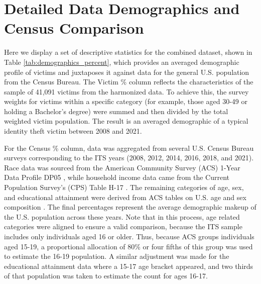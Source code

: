 \clearpage
\appendix



\section{Detailed Data Demographics and Census Comparison}
\label{app:demographics_census}

Here we display a set of descriptive statistics for the combined dataset,  shown in Table \ref{tab:demographics_percent}, which provides an averaged demographic profile of victims and juxtaposes it against data for the general U.S. population from the Census Bureau. The Victim \% column reflects the characteristics of the sample of 41,091 victims from the harmonized data. To achieve this, the survey weights for victims within a specific category (for example, those aged 30-49 or holding a Bachelor's degree) were summed and then divided by the total weighted victim population. The result is an averaged demographic of a typical identity theft victim between 2008 and 2021. 

For the Census \% column, data was aggregated from several U.S. Census Bureau surveys corresponding to the ITS years (2008, 2012, 2014, 2016, 2018, and 2021). Race data was sourced from the American Community Survey (ACS) 1-Year Data Profile DP05 \cite{Census_ACS_DP05}, while household income data came from the Current Population Survey's (CPS) Table H-17 \cite{Census_CPS_H17}. The remaining categories of age, sex, and educational attainment were derived from ACS tables on U.S. age and sex composition \cite{Census_AgeSex}. The final percentages represent the average demographic makeup of the U.S. population across these years. Note that in this process, age related categories were aligned to ensure a valid comparison, because the ITS sample includes only individuals aged 16 or older. Thus, because ACS groups individuals aged 15-19, a proportional allocation of 80\% or four fifths of this group was used to estimate the 16-19 population. A similar adjustment was made for the educational attainment data where a 15-17 age bracket appeared, and two thirds of that population was taken to estimate the count for ages 16-17. 

